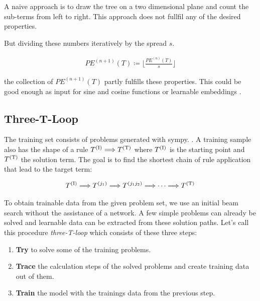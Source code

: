 \documentclass{scrartcl}
\theoremstyle{definition}
\begin{document}
A naive approach is to draw the tree on a two dimensional plane and count the sub-terms from left to right.
This approach does not fullfil any of the desired properties.

But dividing these numbers iteratively by the spread $s$.

\begin{align}
	PE^{(n+1)}\left( T \right) \coloneqq \lfloor \frac{PE^{(n)} \left( T \right)}{s} \rfloor
\end{align}

the collection of $PE^{(n+1)}\left( T \right)$ partly fulfills these properties.
This could be good enough as input for sine and cosine functions or learnable embeddings \cite{gehring2017convolutional}.


\subsection{Three-T-Loop}

The training set consists of problems generated with sympy. \cite{10.7717/peerj-cs.103}.
A training sample also has the shape of a rule $T^{(\text I)} \Longrightarrow T^{(\text T)}$ where $T^{(\text I)}$ is the starting point and $T^{(\text T)}$ the solution term.
The goal is to find the shortest chain of rule application that lead to the target term:

\begin{align}
	T^{(\text I)} \Longrightarrow T^{(j_1)} \Longrightarrow T^{(j_1j_2)} \Longrightarrow \cdots \Longrightarrow T^{(\text T)}
	\label{eq:calculation_chain}
\end{align}

To obtain trainable data from the given problem set, we use an initial beam search without the assistance of a network.
A few simple problems can already be solved and learnable data can be extracted from these solution paths.
Let's call this procedure \textit{three-T-loop} which consists of these three steps:

\begin{enumerate}[label=(\roman*)]
	\item \textbf{Try} to solve some of the training problems.
	\item \textbf{Trace} the calculation steps of the solved problems and create training data out of them.
	\item \textbf{Train} the model with the trainings data from the previous step.
\end{enumerate}
\end{document}
